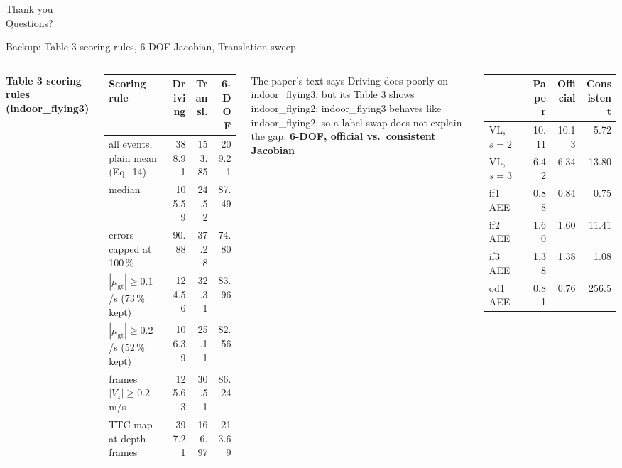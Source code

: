 \documentclass[aspectratio=169,10pt]{beamer}
\newcommand{\sectag}{}
\newcommand{\settag}[1]{\renewcommand{\sectag}{#1}}
\renewcommand{\arraystretch}{1.12}
\begin{document}
\settag{}
\begin{frame}[standout]
  Thank you\\[3mm]
  {\large Questions?}
\end{frame}

\appendix
\settag{Backup}
\begin{frame}{Backup: Table 3 scoring rules, 6-DOF Jacobian, Translation sweep}
  \begin{columns}[T,onlytextwidth]
    \textbf{Table 3 scoring rules (indoor\_flying3)}\\[1mm]
    \footnotesize\setlength{\tabcolsep}{3.5pt}\renewcommand{\arraystretch}{1.02}
    \begin{tabular}{@{}>{\raggedright\arraybackslash}p{3.3cm} r r r@{}}
      \toprule
      Scoring rule & Driving & Transl. & 6-DOF \\
      \midrule
      all events, plain mean (Eq.~14) & 388.91 & 153.85 & 209.21 \\
      median & 105.59 & 24.52 & 87.49 \\
      errors capped at 100\,\% & 90.88 & 37.28 & 74.80 \\
      $|\mu_\text{gt}|\ge 0.1$/s (73\,\% kept) & 124.56 & 32.31 & 83.96 \\
      $|\mu_\text{gt}|\ge 0.2$/s (52\,\% kept) & 106.39 & 25.11 & 82.56 \\
      frames $|V_z|\ge 0.2$\,m/s & 125.63 & 30.51 & 86.24 \\
      TTC map at depth frames & 397.21 & 166.97 & 213.69 \\
      \bottomrule
    \end{tabular}

    \vspace{2mm}
    The paper's text says Driving does poorly on indoor\_flying3, but its Table 3 shows indoor\_flying2;
    indoor\_flying3 behaves like indoor\_flying2, so a label swap does not explain the gap.
    \textbf{6-DOF, official vs.\ consistent Jacobian}\\[1mm]
    \footnotesize\renewcommand{\arraystretch}{1.0}
    \begin{tabular}{@{}lrrr@{}}
      \toprule
      & Paper & Official & Consistent \\
      \midrule
      VL, $s=2$ & 10.11 & 10.13 & 5.72 \\
      VL, $s=3$ & 6.42 & 6.34 & 13.80 \\
      if1 AEE & 0.88 & 0.84 & 0.75 \\
      if2 AEE & 1.60 & 1.60 & 11.41 \\
      if3 AEE & 1.38 & 1.38 & 1.08 \\
      od1 AEE & 0.81 & 0.76 & 256.5 \\
      \bottomrule
    \end{tabular}


\end{columns}
\end{frame}
\end{document}
